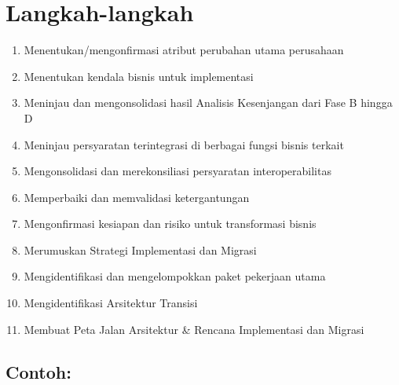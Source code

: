 \section{Langkah-langkah}
\begin{enumerate}
	\item Menentukan/mengonfirmasi atribut perubahan utama perusahaan
	\item Menentukan kendala bisnis untuk implementasi
	\item Meninjau dan mengonsolidasi hasil Analisis Kesenjangan dari Fase B hingga D
	\item Meninjau persyaratan terintegrasi di berbagai fungsi bisnis terkait
	\item Mengonsolidasi dan merekonsiliasi persyaratan interoperabilitas
	\item Memperbaiki dan memvalidasi ketergantungan
	\item Mengonfirmasi kesiapan dan risiko untuk transformasi bisnis
	\item Merumuskan Strategi Implementasi dan Migrasi
	\item Mengidentifikasi dan mengelompokkan paket pekerjaan utama
	\item Mengidentifikasi Arsitektur Transisi
	\item Membuat Peta Jalan Arsitektur \& Rencana Implementasi dan Migrasi
\end{enumerate}

\subsection*{Contoh:}

